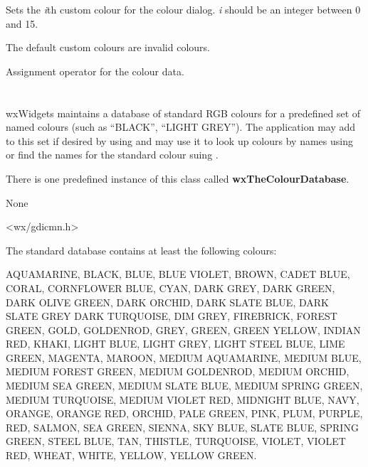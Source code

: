 Sets the {\it i}th custom colour for the colour dialog. {\it i} should
be an integer between 0 and 15.

The default custom colours are invalid colours.


\label{wxcolourdataassign}


Assignment operator for the colour data.




\section{}\label{wxcolourdatabase}

wxWidgets maintains a database of standard RGB colours for a predefined
set of named colours (such as ``BLACK'', ``LIGHT GREY''). The
application may add to this set if desired by using
 and may use it to look up
colours by names using  or find the names
for the standard colour suing .

There is one predefined instance of this class called
{\bf wxTheColourDatabase}.


None


<wx/gdicmn.h>


The standard database contains at least the following colours:

AQUAMARINE, BLACK, BLUE, BLUE VIOLET, BROWN, CADET BLUE, CORAL,
CORNFLOWER BLUE, CYAN, DARK GREY, DARK GREEN, DARK OLIVE GREEN, DARK
ORCHID, DARK SLATE BLUE, DARK SLATE GREY DARK TURQUOISE, DIM GREY,
FIREBRICK, FOREST GREEN, GOLD, GOLDENROD, GREY, GREEN, GREEN YELLOW,
INDIAN RED, KHAKI, LIGHT BLUE, LIGHT GREY, LIGHT STEEL BLUE, LIME GREEN,
MAGENTA, MAROON, MEDIUM AQUAMARINE, MEDIUM BLUE, MEDIUM FOREST GREEN,
MEDIUM GOLDENROD, MEDIUM ORCHID, MEDIUM SEA GREEN, MEDIUM SLATE BLUE,
MEDIUM SPRING GREEN, MEDIUM TURQUOISE, MEDIUM VIOLET RED, MIDNIGHT BLUE,
NAVY, ORANGE, ORANGE RED, ORCHID, PALE GREEN, PINK, PLUM, PURPLE, RED,
SALMON, SEA GREEN, SIENNA, SKY BLUE, SLATE BLUE, SPRING GREEN, STEEL
BLUE, TAN, THISTLE, TURQUOISE, VIOLET, VIOLET RED, WHEAT, WHITE, YELLOW,
YELLOW GREEN.

